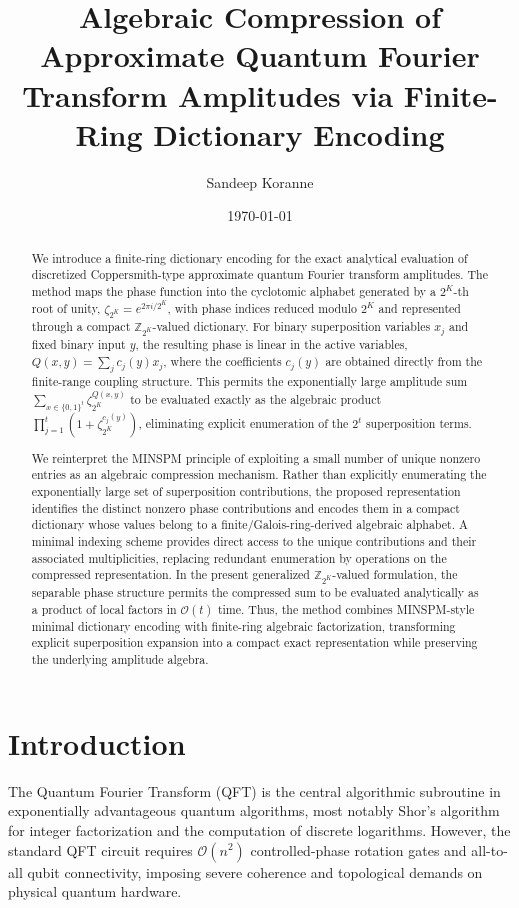 \documentclass[11pt, a4paper]{article}
\title{Algebraic Compression of Approximate Quantum Fourier Transform Amplitudes via Finite-Ring Dictionary Encoding}
\author{Sandeep Koranne}
\date{\today}
\begin{document}
\maketitle

\begin{abstract}
We introduce a finite-ring dictionary encoding for the exact analytical evaluation of discretized Coppersmith-type approximate quantum Fourier transform amplitudes. The method maps the phase function into the cyclotomic alphabet generated by a $2^K$-th root of unity, $\zeta_{2^K} = e^{2\pi i/2^K}$, with phase indices reduced modulo $2^K$ and represented through a compact $\mathbb{Z}_{2^K}$-valued dictionary. For binary superposition variables $x_j$ and fixed binary input $y$, the resulting phase is linear in the active variables, $Q(x,y) = \sum_j c_j(y)x_j$, where the coefficients $c_j(y)$ are obtained directly from the finite-range coupling structure. This permits the exponentially large amplitude sum $\sum_{x\in\{0,1\}^t}\zeta_{2^K}^{Q(x,y)}$ to be evaluated exactly as the algebraic product $\prod_{j=1}^{t}(1+\zeta_{2^K}^{c_j(y)})$, eliminating explicit enumeration of the $2^t$ superposition terms. 

We reinterpret the MINSPM principle of exploiting a small number of unique nonzero entries as an algebraic compression mechanism. Rather than explicitly enumerating the exponentially large set of superposition contributions, the proposed representation identifies the distinct nonzero phase contributions and encodes them in a compact dictionary whose values belong to a finite/Galois-ring-derived algebraic alphabet. A minimal indexing scheme provides direct access to the unique contributions and their associated multiplicities, replacing redundant enumeration by operations on the compressed representation. In the present generalized $\mathbb{Z}_{2^K}$-valued formulation, the separable phase structure permits the compressed sum to be evaluated analytically as a product of local factors in $\mathcal{O}(t)$ time. Thus, the method combines MINSPM-style minimal dictionary encoding with finite-ring algebraic factorization, transforming explicit superposition expansion into a compact exact representation while preserving the underlying amplitude algebra.
\end{abstract}

\section{Introduction}
The Quantum Fourier Transform (QFT) is the central algorithmic subroutine in exponentially advantageous quantum algorithms, most notably Shor's algorithm for integer factorization and the computation of discrete logarithms. However, the standard QFT circuit requires $\mathcal{O}(n^2)$ controlled-phase rotation gates and all-to-all qubit connectivity, imposing severe coherence and topological demands on physical quantum hardware. 
\end{document}
